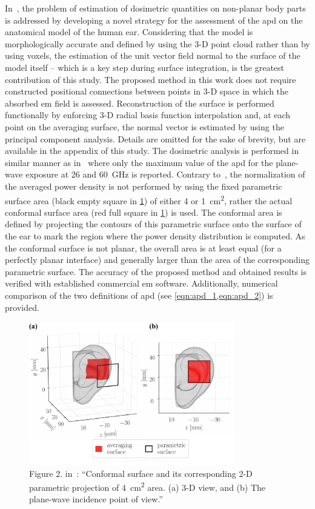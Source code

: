 In~\cite{Kapetanovic2022AssessmentJERM}, the problem of estimation of dosimetric quantities on non-planar body parts is addressed by developing a novel strategy for the assessment of the \gls{apd} on the anatomical model of the human ear.
Considering that the model is morphologically accurate and defined by using the 3-D point cloud rather than by using voxels, the estimation of the unit vector field normal to the surface of the model itself -- which is a key step during surface integration, is the greatest contribution of this study.
The proposed method in this work does not require constructed positional connections between points in 3-D space in which the absorbed \gls{em} field is assessed.
Reconstruction of the surface is performed functionally by enforcing 3-D radial basis function interpolation and, at each point on the averaging surface, the normal vector is estimated by using the principal component analysis.
Details are omitted for the sake of brevity, but are available in the appendix of this study.
The dosimetric analysis is performed in similar manner as in~\cite{Taguchi2022Computation} where only the maximum value of the \gls{apd} for the plane-wave exposure at \SI{26}{} and \SI{60}{\GHz} is reported.
Contrary to~\cite{Taguchi2022Computation}, the normalization of the averaged power density is not performed by using the fixed parametric surface area (black empty square in \cref{fig:kapetanovic2022assessment}) of either \SI{4}{} or \SI{1}{\cm\squared}, rather the actual conformal surface area (red full square in \cref{fig:kapetanovic2022assessment}) is used.
The conformal area is defined by projecting the contours of this parametric surface onto the surface of the ear to mark the region where the power density distribution is computed.
As the conformal surface is not planar, the overall area is at least equal (for a perfectly planar interface) and generally larger than the area of the corresponding parametric surface.
The accuracy of the proposed method and obtained results is verified with established commercial \gls{em} software.
Additionally, numerical comparison of the two definitions of \gls{apd} (see \cref{eqn:apd_1,eqn:apd_2}) is provided.
\begin{figure}[ht]
    \centering
    \includegraphics[width=0.8\textwidth]{artwork/Kapetanovic2022Assessment_figure2.pdf}
    \caption{Figure 2. in~\cite{Kapetanovic2022AssessmentJERM}: ``Conformal surface and its corresponding 2-D parametric projection of \SI{4}{\cm\squared} area. (a) 3-D view, and (b) The plane-wave incidence point of view.''}
    \label{fig:kapetanovic2022assessment}
\end{figure}
